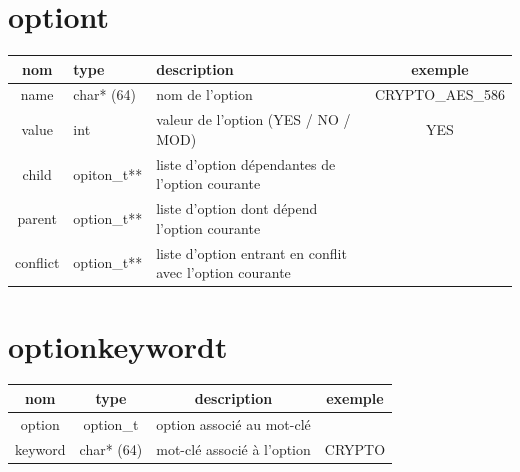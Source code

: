 \documentclass[16pts]{report}
\begin{document}
\section{option\textunderscore t}
\label{sec:option t}

\begin{tabularx}{\textwidth}{|c|X|X|c|}
\hline
nom & type & description & exemple \\
\hline
\hline
name & char* (64) & nom de l'option & CRYPTO\_AES\_586 \\
\hline
value & int & valeur de l'option (YES / NO / MOD) & YES \\
\hline
child & opiton\_t** & liste d'option dépendantes de l'option courante & \\
\hline
parent & option\_t** & liste d'option dont dépend l'option courante & \\
\hline
conflict & option\_t** & liste d'option entrant en conflit avec l'option courante &  \\
\hline
\end{tabularx}

\section{option\textunderscore keyword\textunderscore t}
\label{sec:option keyword t}

\begin{tabular}{|c|c|c|c|}
\hline
nom & type & description & exemple \\
\hline
\hline
option & option\_t & option associé au mot-clé & \\
\hline
keyword & char* (64) & mot-clé associé à l'option & CRYPTO \\
\hline
\end{tabular}
\end{document}
